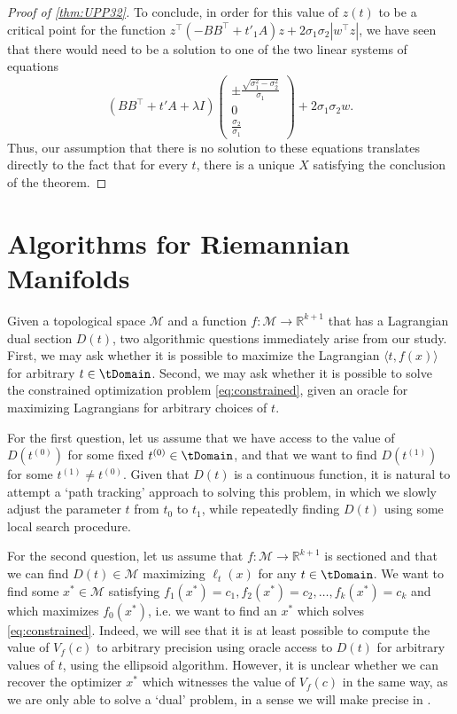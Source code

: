 \documentclass{article}
\numberwithin{equation}{section}
\newcommand{\R}{\mathbb{R}}
\newcommand{\cM}{{\mathcal{M}}}
\newcommand{\Voptf}{V_{f}}
\begin{document}
\begin{proof}[Proof of \cref{thm:UPP32}]
    To conclude, in order for this value of $z(t)$ to be a critical point for the function $z^{\intercal}(-BB^{\intercal} + t'_1A)z + 2\sigma_1\sigma_2|w^{\intercal}z|$, we have seen that there would need to be a solution to one of the two linear systems of equations
    \[
        (BB^{\intercal} + t' A + \lambda I)\begin{pmatrix} \pm \frac{\sqrt{\sigma_1^2 - \sigma_2^2}}{\sigma_1}\\ 0\\ \frac{\sigma_2}{\sigma_1} \end{pmatrix} + 2\sigma_1\sigma_2w.
    \]
    Thus, our assumption that there is no solution to these equations translates directly to the fact that for every $t$, there is a unique $X$ satisfying the conclusion of the theorem.
\end{proof}

\section{Algorithms for Riemannian Manifolds}\label{sec:alg-in-Riemannian-case}
Given a topological space $\cM$ and a function $f : \cM\rightarrow \R^{k+1}$ that
has a Lagrangian dual section $D(t)$, two algorithmic questions immediately arise from our study. First, we may ask whether it is possible to maximize the Lagrangian  $\langle t, f(x)\rangle$ for arbitrary $t \in \tDomain$. Second, we may ask whether it is possible to solve the constrained optimization problem \eqref{eq:constrained}, given an oracle for maximizing Lagrangians for arbitrary choices of $t$. 

For the first question, let us assume that we have access to the value of $D(t^{(0)})$ for some fixed $t^{(0)} \in \tDomain$, 
and that we want to find $D(t^{(1)})$ for some $t^{(1)} \neq t^{(0)}$. Given that $D(t)$ is a continuous function, it is natural to attempt a `path tracking' approach to solving this problem, in which we slowly adjust the parameter $t$ from $t_0$ to $t_1$, while repeatedly finding $D(t)$ using some local search procedure.

For the second question, let us assume that $f :\cM \rightarrow \R^{k+1}$ is sectioned and that we can find $D(t) \in \cM$ maximizing $\ell_t(x)$ for any $t \in \tDomain$. We want to find some $x^* \in \cM$ satisfying $f_1(x^*) = c_1, f_2(x^*) = c_2, \dots, f_k(x^*) = c_k$ and which maximizes $f_0(x^*)$, i.e. we want to find an $x^*$ which solves \ref{eq:constrained}. 
Indeed, we will see that it is at least possible to compute the value of $\Voptf(c)$ to arbitrary precision using oracle access to $D(t)$ for arbitrary values of $t$, using the ellipsoid algorithm. However, it is unclear whether we can recover the optimizer $x^*$ which witnesses the value of $\Voptf(c)$ in the same way, as we are only able to solve a `dual' problem, in a sense we will make precise in .
\end{document}
